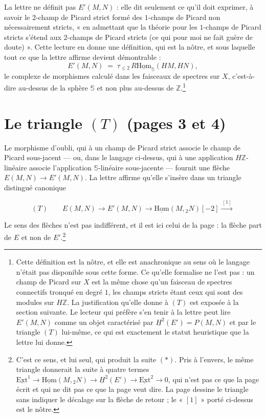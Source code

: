 \documentclass[11pt,a4paper]{article}
\begin{document}
La lettre ne définit pas $E'(M,N)$ : elle dit seulement ce qu'il doit
exprimer, à savoir le $2$-champ de Picard strict formé des $1$-champs de
Picard non nécessairement stricts, « en admettant que la théorie pour les
$1$-champs de Picard stricts s'étend aux $2$-champs de Picard stricts (ce qui
pour moi ne fait guère de doute) ». Cette lecture en donne une définition,
qui est la nôtre, et sous laquelle tout ce que la lettre affirme devient
démontrable :
\[ E'(M,N) \;=\; \tau_{\leq 2} \, R\underline{\mathrm{Hom}}_{\mathbb{S}}(HM, HN), \]
le complexe de morphismes calculé dans les faisceaux de spectres sur $X$,
c'est-à-dire au-dessus de la sphère $\mathbb{S}$ et non plus au-dessus de
$\mathbb{Z}$.\footnote{Cette définition est la nôtre, et elle est anachronique
au sens où le langage n'était pas disponible sous cette forme. Ce qu'elle
formalise ne l'est pas : un champ de Picard sur $X$ est la même chose qu'un
faisceau de spectres connectifs tronqué en degré $1$, les champs stricts
étant ceux qui sont des modules sur $H\mathbb{Z}$. La justification qu'elle
donne à $(T)$ est exposée à la section suivante. Le lecteur qui préfère s'en
tenir à la lettre peut lire $E'(M,N)$ comme un objet caractérisé par
$\underline{H}^2(E') = P(M,N)$ et par le triangle $(T)$ lui-même, ce qui est
exactement le statut heuristique que la lettre lui donne.}

\section*{Le triangle $(T)$ (pages 3 et 4)}

Le morphisme d'oubli, qui à un champ de Picard strict associe le champ de
Picard sous-jacent --- ou, dans le langage ci-dessus, qui à une application
$H\mathbb{Z}$-linéaire associe l'application $\mathbb{S}$-linéaire
sous-jacente --- fournit une flèche $E(M,N) \to E'(M,N)$. La lettre affirme
qu'elle s'insère dans un triangle distingué canonique
\[ (T) \qquad E(M,N) \longrightarrow E'(M,N) \longrightarrow
   \underline{\mathrm{Hom}}(M, {}_2 N)[-2] \xrightarrow{\ [1]\ } \]

Le sens des flèches n'est pas indifférent, et il est ici celui de la page : la
flèche part de $E$ et non de $E'$.\footnote{C'est ce sens, et lui seul, qui
produit la suite $(*)$. Pris à l'envers, le même triangle donnerait la suite à
quatre termes $\underline{\mathrm{Ext}}^1 \to \underline{\mathrm{Hom}}(M,{}_2N)
\to \underline{H}^2(E') \to \underline{\mathrm{Ext}}^2 \to 0$, qui n'est pas
ce que la page écrit et qui ne dit pas ce que la page veut dire. La page
dessine le triangle sans indiquer le décalage sur la flèche de retour ; le
« $[1]$ » porté ci-dessus est le nôtre.}
\end{document}

